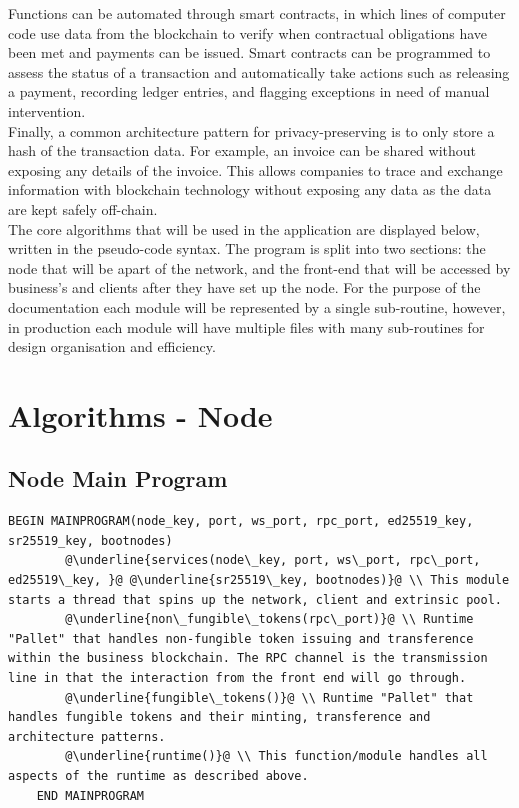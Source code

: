 Functions can be automated through smart contracts, in which lines of computer code use data from the blockchain to verify when contractual obligations have been met and payments can be issued. Smart contracts can be programmed to assess the status of a transaction and automatically take actions such as releasing a payment, recording ledger entries, and flagging exceptions in need of manual intervention. \\

Finally, a common architecture pattern for privacy-preserving is to only store a hash of the transaction data. For example, an invoice can be shared without exposing any details of the invoice. This allows companies to trace and exchange information with blockchain technology without exposing any data as the data are kept safely off-chain. \\

The core algorithms that will be used in the application are displayed below, written in the pseudo-code syntax. The program is split into two sections: the node that will be apart of the network, and the front-end that will be accessed by business's and clients after they have set up the node. For the purpose of the documentation each module will be represented by a single sub-routine, however, in production each module will have multiple files with many sub-routines for design organisation and efficiency. \\

\section{Algorithms - Node}
\subsection{Node Main Program}

\begin{lstlisting}[caption=Main Program, escapechar=\@]
	BEGIN MAINPROGRAM(node_key, port, ws_port, rpc_port, ed25519_key, sr25519_key, bootnodes)
		@\underline{services(node\_key, port, ws\_port, rpc\_port, ed25519\_key, }@ @\underline{sr25519\_key, bootnodes)}@ \\ This module starts a thread that spins up the network, client and extrinsic pool.
		@\underline{non\_fungible\_tokens(rpc\_port)}@ \\ Runtime "Pallet" that handles non-fungible token issuing and transference within the business blockchain. The RPC channel is the transmission line in that the interaction from the front end will go through.
		@\underline{fungible\_tokens()}@ \\ Runtime "Pallet" that handles fungible tokens and their minting, transference and architecture patterns.
		@\underline{runtime()}@ \\ This function/module handles all aspects of the runtime as described above.
	END MAINPROGRAM

\end{lstlisting}
